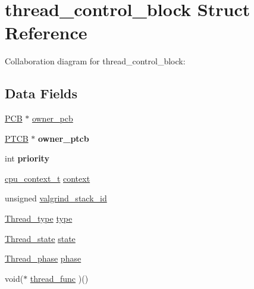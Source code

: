 \hypertarget{structthread__control__block}{}\section{thread\+\_\+control\+\_\+block Struct Reference}
\label{structthread__control__block}


Collaboration diagram for thread\+\_\+control\+\_\+block\+:
\subsection*{Data Fields}
\begin{DoxyCompactItemize}
\item 
\hyperlink{group__proc_gadf327f09ee935cf1734c14e8849f0421}{P\+CB} $\ast$ \hyperlink{structthread__control__block_a74aa312623cb8be2bc719d5210b58c04}{owner\+\_\+pcb}
\item 
\mbox{\label{structthread__control__block_ae9b6a0650c4cf3fd826669ae3da4ef00}} 
\hyperlink{group__scheduler_ga2115e4c199a702aaf36f4571877bf013}{P\+T\+CB} $\ast$ {\bfseries owner\+\_\+ptcb}
\item 
\mbox{\label{structthread__control__block_a5ec002eff0fbf32c29710990bc214d86}} 
int {\bfseries priority}
\item 
\hyperlink{bios_8h_a6067c1395a75fc3e17f1ea6353065b54}{cpu\+\_\+context\+\_\+t} \hyperlink{structthread__control__block_a9c107039dffa851dde6edabd6cd3f89c}{context}
\item 
unsigned \hyperlink{structthread__control__block_ad8a2da36c0ad775c12c5f66f4fec9d41}{valgrind\+\_\+stack\+\_\+id}
\item 
\hyperlink{group__scheduler_ga18795bc1ab00161fc27ce34b1895fb03}{Thread\+\_\+type} \hyperlink{structthread__control__block_abd0f40bdcb22c701df03f560bbc42d5c}{type}
\item 
\hyperlink{group__scheduler_ga6c969c169777f82c104cf73e501df70f}{Thread\+\_\+state} \hyperlink{structthread__control__block_affd872365cf4768fa1c9bd1e196bb97c}{state}
\item 
\hyperlink{group__scheduler_gab180b4aa356776bddcd724cef4f5deae}{Thread\+\_\+phase} \hyperlink{structthread__control__block_aa7e8e6a00c5f9f25210a49589ad818f8}{phase}
\item 
void($\ast$ \hyperlink{structthread__control__block_a91a73f2ad3f727b7412b912b3d65109a}{thread\+\_\+func} )()

\end{DoxyCompactItemize}
